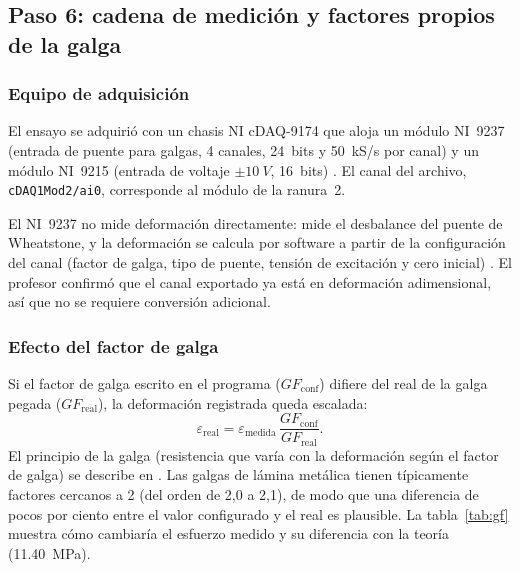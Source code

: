 \documentclass[11pt,a4paper]{article}
\begin{document}
\subsection{Paso 6: cadena de medici\'on y factores propios de la galga}
\subsubsection{Equipo de adquisici\'on}
El ensayo se adquiri\'o con un chasis NI cDAQ-9174 que aloja un m\'odulo NI~9237 (entrada de puente para galgas, 4 canales, 24~bits y \SI{50}{kS/s} por canal) y un m\'odulo NI~9215 (entrada de voltaje $\pm\SI{10}{V}$, 16~bits) \cite{ni9237,ni9215}. El canal del archivo, \texttt{cDAQ1Mod2/ai0}, corresponde al m\'odulo de la ranura~2.

El NI~9237 no mide deformaci\'on directamente: mide el desbalance del puente de Wheatstone, y la deformaci\'on se calcula por software a partir de la configuraci\'on del canal (factor de galga, tipo de puente, tensi\'on de excitaci\'on y cero inicial) \cite{ni9237}. El profesor confirm\'o que el canal exportado ya est\'a en deformaci\'on adimensional, as\'i que no se requiere conversi\'on adicional.

\subsubsection{Efecto del factor de galga}
Si el factor de galga escrito en el programa ($GF_\text{conf}$) difiere del real de la galga pegada ($GF_\text{real}$), la deformaci\'on registrada queda escalada:
\begin{equation}
\varepsilon_\text{real}=\varepsilon_\text{medida}\,\frac{GF_\text{conf}}{GF_\text{real}}.
\end{equation}
El principio de la galga (resistencia que var\'ia con la deformaci\'on seg\'un el factor de galga) se describe en \cite{hoff}. Las galgas de l\'amina met\'alica tienen t\'ipicamente factores cercanos a 2 (del orden de 2,0 a 2,1), de modo que una diferencia de pocos por ciento entre el valor configurado y el real es plausible. La tabla~\ref{tab:gf} muestra c\'omo cambiar\'ia el esfuerzo medido y su diferencia con la teor\'ia (\SI{11,40}{MPa}).
\end{document}
